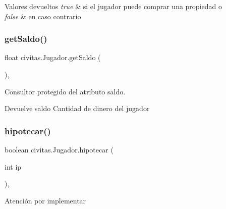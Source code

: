 \begin{DoxyRetVals}{Valores devueltos}
{\em true} & si el jugador puede comprar una propiedad o \\
\hline
{\em false} & en caso contrario \\
\hline
\end{DoxyRetVals}
\mbox{\label{classcivitas_1_1Jugador_a3c9d02f7974457585c0e2a58ccad6c76}} 
\subsubsection{\texorpdfstring{get\+Saldo()}{getSaldo()}}
{\footnotesize\ttfamily float civitas.\+Jugador.\+get\+Saldo (\begin{DoxyParamCaption}{ }\end{DoxyParamCaption})\hspace{0.3cm}{\ttfamily [inline]}, {\ttfamily [protected]}}

Consultor protegido del atributo saldo. \begin{DoxyReturn}{Devuelve}
saldo Cantidad de dinero del jugador 
\end{DoxyReturn}
\mbox{\label{classcivitas_1_1Jugador_aad3e438212a101326c99e79c3c314f4b}} 
\subsubsection{\texorpdfstring{hipotecar()}{hipotecar()}}
{\footnotesize\ttfamily boolean civitas.\+Jugador.\+hipotecar (\begin{DoxyParamCaption}\item[{int}]{ip }\end{DoxyParamCaption})\hspace{0.3cm}{\ttfamily [inline]}, {\ttfamily [package]}}

\begin{DoxyWarning}{Atención}
por implementar 
\end{DoxyWarning}
\mbox{\label{classcivitas_1_1Jugador_a05547894205ba819363c25f40addecae}} 
